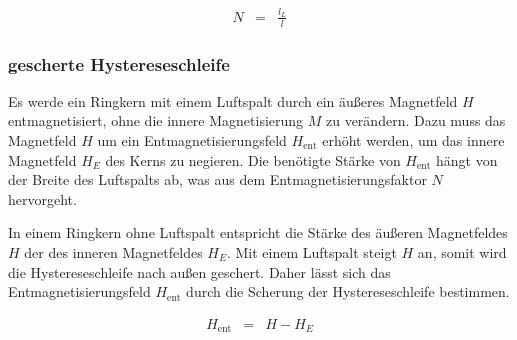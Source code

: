 \documentclass[12pt,a4paper]{scrartcl}
\numberwithin{equation}{section} %
\begin{document}
\begin{eqnarray}
    N &=& \frac{l_L}{l}
\end{eqnarray}

\hypertarget{gescherte-hystereseschleife}{%
\subsubsection{gescherte
Hystereseschleife}\label{gescherte-hystereseschleife}}

Es werde ein Ringkern mit einem Luftspalt durch ein äußeres Magnetfeld
$H$ entmagnetisiert, ohne die innere Magnetisierung $M$ zu
verändern. Dazu muss das Magnetfeld $H$ um ein Entmagnetisierungsfeld
$H_\mathrm{ent}$ erhöht werden, um das innere Magnetfeld $H_E$ des
Kerns zu negieren. Die benötigte Stärke von $H_\mathrm{ent}$ hängt von
der Breite des Luftspalts ab, was aus dem Entmagnetisierungsfaktor $N$
hervorgeht.

In einem Ringkern ohne Luftspalt entspricht die Stärke des äußeren
Magnetfeldes $H$ der des inneren Magnetfeldes $H_E$. Mit einem
Luftspalt steigt $H$ an, somit wird die Hystereseschleife nach außen
geschert. Daher lässt sich das Entmagnetisierungsfeld $H_\mathrm{ent}$
durch die Scherung der Hystereseschleife bestimmen.

\begin{eqnarray}
    H_\mathrm{ent} &=& H - H_E
\end{eqnarray}
\end{document}
